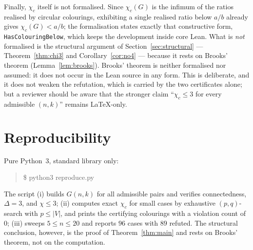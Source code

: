 \documentclass[11pt]{article}
\theoremstyle{definition}
\newcommand{\chic}{\chi_c}
\newcommand{\Gn}{G(n,k)}
\begin{document}
Finally, $\chic$ itself is not formalised. Since $\chic(G)$ is the infimum of
the ratios realised by circular colourings, exhibiting a single realised ratio
below $a/b$ already gives $\chic(G) < a/b$; the formalisation states exactly
that constructive form, \texttt{HasColouringBelow}, which keeps the development
inside core Lean. What is \emph{not} formalised is the structural argument of
Section~\ref{sec:structural} --- Theorem~\ref{thm:chi3} and
Corollary~\ref{cor:no4} --- because it rests on Brooks' theorem
(Lemma~\ref{lem:brooks}). Brooks' theorem is neither formalised nor assumed: it
does not occur in the Lean source in any form. This is deliberate, and it does
not weaken the refutation, which is carried by the two certificates alone; but
a reviewer should be aware that the stronger claim ``$\chic \le 3$ for every
admissible $(n,k)$'' remains LaTeX-only.

\section{Reproducibility}

Pure Python~3, standard library only:

\begin{quote}\ttfamily
\$ python3 reproduce.py
\end{quote}

The script (i) builds $\Gn$ for all admissible pairs and verifies
connectedness, $\Delta = 3$, and $\chi \le 3$; (ii) computes exact $\chic$ for
small cases by exhaustive $(p,q)$-search with $p \le |V|$, and prints the
certifying colourings with a violation count of $0$; (iii) sweeps
$5 \le n \le 20$ and reports $96$ cases with $89$ refuted. The structural
conclusion, however, is the proof of Theorem~\ref{thm:main} and rests on
Brooks' theorem, not on the computation.
\end{document}
